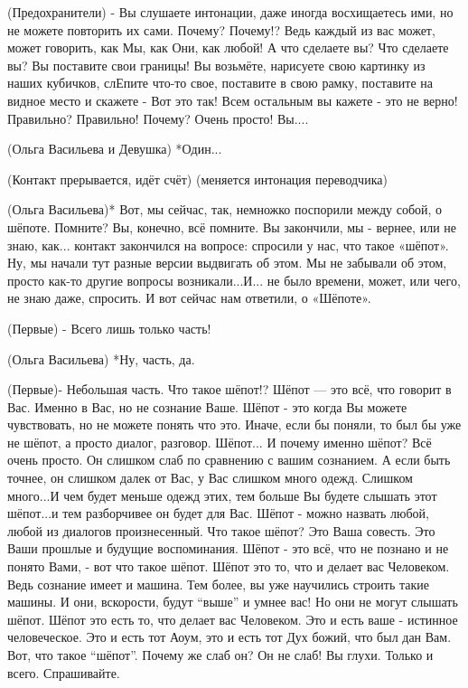 (Предохранители) - Вы слушаете интонации, даже иногда восхищаетесь ими, но не можете повторить их сами. Почему? Почему!? Ведь каждый из вас может, может говорить, как Мы, как Они, как любой! А что сделаете вы? Что сделаете вы?  Вы поставите свои границы! Вы возьмёте, нарисуете свою картинку из наших кубичков, слЕпите что-то свое, поставите в свою рамку, поставите на видное место и скажете - Вот это так! Всем остальным вы кажете - это не верно! Правильно? Правильно!  Почему? Очень просто! Вы....

(Ольга Васильева и Девушка) *Один... 


(Контакт прерывается, идёт счёт)
(меняется интонация переводчика)

(Ольга Васильева)* Вот, мы сейчас, так, немножко поспорили между собой,  о шёпоте. Помните? Вы, конечно, всё помните. Вы закончили, мы - вернее, или не знаю, как... контакт закончился на вопросе: спросили у нас, что такое «шёпот». Ну, мы начали тут разные версии выдвигать об этом. Мы не забывали об этом, просто как-то другие вопросы возникали...И... не было времени, может, или чего, не знаю даже, спросить. И вот сейчас нам ответили, о «Шёпоте».

(Первые) - Всего лишь только часть!

(Ольга Васильева) *Ну, часть, да.

(Первые)-  Небольшая часть. Что такое шёпот!? Шёпот — это всё, что говорит в Вас. Именно в Вас, но не сознание Ваше. Шёпот - это когда Вы можете чувствовать, но не можете понять что это. Иначе, если бы поняли, то был бы уже не шёпот, а просто диалог, разговор. Шёпот... И почему именно шёпот? Всё очень просто. Он слишком слаб по сравнению с вашим сознанием. А если быть точнее, он слишком далек от Вас, у Вас слишком много одежд. Слишком много...И чем будет меньше одежд этих, тем больше Вы будете слышать этот шёпот...и тем разборчивее он будет для Вас. Шёпот - можно назвать любой, любой из диалогов произнесенный. Что такое шёпот? Это Ваша совесть. Это Ваши прошлые и будущие воспоминания. Шёпот - это всё, что не познано и не понято Вами, - вот что такое шёпот. Шёпот это то, что и делает вас Человеком. Ведь сознание имеет и машина. Тем более, вы уже научились строить такие машины. И они, вскорости, будут “выше” и умнее вас! Но они не могут слышать шёпот. Шёпот это есть то, что делает вас Человеком. Это и есть ваше - истинное человеческое. Это и есть тот Аоум, это и есть тот Дух божий, что был дан Вам. Вот, что такое “шёпот”. Почему же слаб он? Он не слаб! Вы глухи. Только и всего. Спрашивайте.

